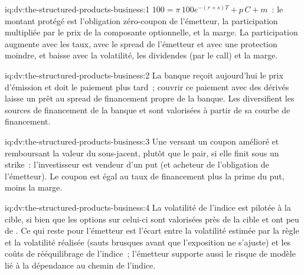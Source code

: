\begin{solution}{iq:dv:the-structured-products-business:1}
$100=\pi\,100e^{-(r+s)T}+p\,C+m$~: le montant protégé est l'obligation zéro-coupon de l'émetteur, la participation multipliée par le prix de la composante optionnelle, et
la marge. La participation augmente avec les taux, avec le spread de l'émetteur et avec une protection moindre, et baisse avec la volatilité, les dividendes
(par le call) et la marge.
\end{solution}

\begin{solution}{iq:dv:the-structured-products-business:2}
La banque reçoit aujourd'hui le prix d'émission et doit le paiement plus tard~; couvrir ce paiement avec des dérivés laisse un prêt au
spread de financement propre de la banque. Les  diversifient les sources de financement de la banque et sont valorisées à partir de sa courbe de financement.
\end{solution}

\begin{solution}{iq:dv:the-structured-products-business:3}
Une  versant un coupon amélioré et remboursant la valeur du sous-jacent, plutôt que le pair, si elle finit sous un strike~: l'investisseur est vendeur d'un put
(et acheteur de l'obligation de l'émetteur). Le coupon est égal au taux de financement plus la prime du put, moins la marge.
\end{solution}

\begin{solution}{iq:dv:the-structured-products-business:4}
La volatilité de l'indice est pilotée à la cible, si bien que les options sur celui-ci sont valorisées près de la cible et ont peu de . Ce qui reste pour l'émetteur
est l'écart entre la volatilité estimée par la règle et la volatilité réalisée (sauts brusques avant que l'exposition ne s'ajuste) et les coûts de rééquilibrage de l'indice~;
l'émetteur supporte aussi le risque de modèle lié à la dépendance au chemin de l'indice.
\end{solution}

